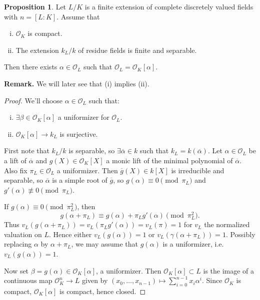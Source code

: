 \documentclass{article}
\theoremstyle{definition}
\newtheorem{prop}[theorem]{Proposition}
\begin{document}
\begin{prop}\label{prop6.8}
    Let $L/K$ is a finite extension of complete discretely valued fields with $n = [L:K]$. Assume that
    \begin{enumerate}[(i)]
        \item $\mathcal{O}_K$ is compact.
        \item The extension $k_{L}/k$ of residue fields is finite and separable.
    \end{enumerate}
    Then there exists $\alpha \in \mathcal{O}_L$ such that $\mathcal{O}_L = \mathcal{O}_K[\alpha]$.
\end{prop}
\textbf{Remark.} We will later see that (i) implies (ii).
\begin{proof}
    We'll choose $\alpha \in \mathcal{O}_L$ such that:
    \begin{enumerate}[(i)]
        \item $\exists \beta \in \mathcal{O}_K[\alpha]$ a uniformizer for $\mathcal{O}_L$.
        \item $\mathcal{O}_K[\alpha] \to k_L$ is surjective.
    \end{enumerate}
    First note that $k_L/k$ is separable, so $\exists \overline{\alpha} \in k$ such that $k_L = k(\overline{\alpha})$. Let $\alpha \in \mathcal{O}_L$ be a lift of $\overline{\alpha}$ and $g(X) \in \mathcal{O}_K[X]$ a monic lift of the minimal polynomial of $\overline{\alpha}$. Also fix $\pi_L \in \mathcal{O}_L$ a uniformizer. Then $\overline{g}(X) \in k[X]$ is irreducible and separable, so $\overline{\alpha}$ is a simple root of $\overline{g}$, so $g(\alpha) \equiv 0 \pmod{\pi_L}$ and $g'(\alpha) \not\equiv 0 \pmod{\pi_L}$.
    \vspace{1mm}
     
    If $g(\alpha) \equiv  0 \pmod{\pi_L^2}$, then \[
    g(\alpha + \pi_L) \equiv  g(\alpha) + \pi_L g'(\alpha) \pmod{\pi_L^2}.
    \]
    Thus $v_L(g(\alpha+\pi_L)) = v_L(\pi_Lg'(\alpha)) = v_L(\pi) = 1$ for $v_L$ the normalized valuation on $L$. Hence either $v_L(g(\alpha))= 1$ or $v_L(\gamma(\alpha+\pi_L)) = 1$. Possibly replacing $\alpha$ by $\alpha + \pi_L$, we may assume that $g(\alpha)$ is a uniformizer, i.e. $v_L(g(\alpha)) = 1$.
    \vspace{1mm}
     
    Now set $\beta = g(\alpha) \in \mathcal{O}_K[\alpha]$, a uniformizer. Then $\mathcal{O}_K[\alpha] \subset L$ is the image of a continuous map $\mathcal{O}_K^n \to L$ given by $(x_0,\ldots,x_{n-1}) \mapsto \sum_{i=0}^{n-1} x_i \alpha^i$. Since $\mathcal{O}_K$ is compact, $\mathcal{O}_K[\alpha]$ is compact, hence closed.
    \vspace{1mm}
     

\end{proof}
\end{document}
